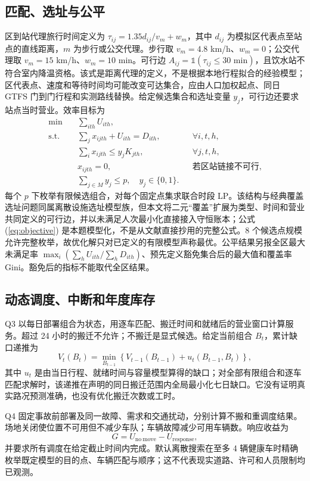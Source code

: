 \documentclass[12pt]{article}
\begin{document}
\subsection{匹配、选址与公平}
区到站代理旅行时间定义为 $\tau_{ij}=1.35d_{ij}/v_m+w_m$，其中 $d_{ij}$ 为模拟区代表点至站点的直线距离，$m$ 为步行或公交代理。步行取 $v_m=4.8$ km/h、$w_m=0$；公交代理取 $v_m=15$ km/h、$w_m=10$ min。可行边 $A_{ij}=\mathbb{1}(\tau_{ij}\leq30\text{ min})$，且饮水站不符合室内降温资格。该式是距离代理的定义，不是根据本地行程拟合的经验模型；区代表点、速度和等待时间均可能改变可达集合，应由人口加权起点、同日 GTFS 门到门行程和实测路线替换。给定候选集合和选址变量 $y_j$，可行边还要求站点当时营业。效率目标为
\begin{align}
 \min\quad & \sum_{ith} U_{ith}, \label{eq:objective}\\
 \text{s.t.}\quad & \sum_j x_{ijth}+U_{ith}=D_{ith}, &&\forall i,t,h,\\
 & \sum_i x_{ijth}\leq y_j K_{jth}, &&\forall j,t,h,\\
 & x_{ijth}=0, &&\text{若区站链接不可行},\\
 & \sum_{j\in M}y_j\leq p,\quad y_j\in\{0,1\}. &&
\end{align}
每个 $p$ 下枚举有限候选组合，对每个固定点集求联合时段 LP。该结构与经典覆盖选址问题同属离散设施选址模型族\citep{church1974,daskin2013}，但本文将二元“覆盖”扩展为类型、时间和营业共同定义的可行边，并以未满足人次最小化直接接入守恒账本；公式\,(\ref{eq:objective}) 是本题模型化，不是从文献直接抄用的完整公式。8 个候选点规模允许完整枚举，故优化解只对已定义的有限模型声称最优。公平结果另报全区最大未满足率 $\max_i(\sum_hU_{ith}/\sum_hD_{ith})$、预先定义豁免集合后的最大值和覆盖率 Gini。豁免后的指标不能取代全区结果。

\subsection{动态调度、中断和年度库存}
Q3 以每日部署组合为状态，用逐车匹配、搬迁时间和就绪后的营业窗口计算服务。超过 24 小时的搬迁不允许；不搬迁是显式候选。给定当前组合 $B_t$，累计缺口递推为
\begin{equation}
 V_t(B_t)=\min_{B_{t-1}}\left\{V_{t-1}(B_{t-1})+u_t(B_{t-1},B_t)\right\},
 \label{eq:week-dp}
\end{equation}
其中 $u_t$ 是由当日行程、就绪时间与容量模型算得的缺口；对全部有限组合和逐车匹配求解时，该递推在声明的同日搬迁范围内全局最小化七日缺口\citep{bellman1957}。它没有证明真实路况预测准确，也没有优化搬迁次数或工时。

Q4 固定事故前部署及同一故障、需求和交通扰动，分别计算不搬和重调度结果。场地关闭使位置不可用但不减少车队；车辆故障减少可用车辆数。响应收益为
\begin{equation}
 G=U_{\mathrm{no\ move}}-U_{\mathrm{response}},
\end{equation}
并要求所有调度在给定截止时间内完成。默认离散搜索在至多 4 辆健康车时精确枚举既定模型的目的点、车辆匹配与顺序；这不代表现实道路、许可和人员限制均已观测。
\end{document}
